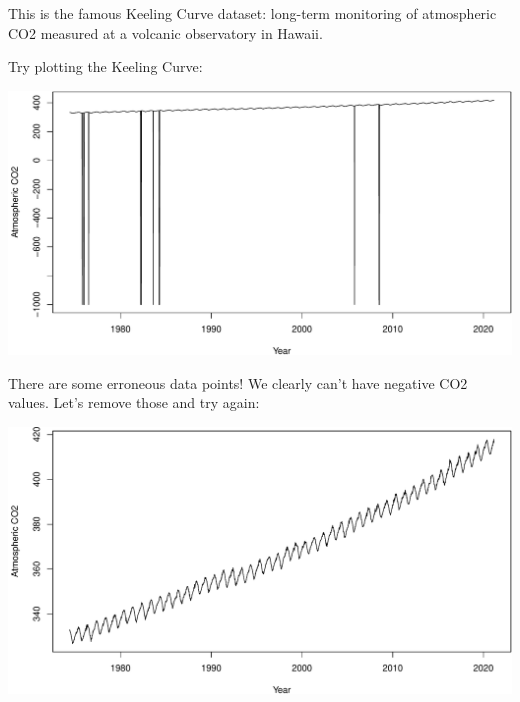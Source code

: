 \documentclass[
]{book}
\newenvironment{Shaded}{\begin{snugshade}}{\end{snugshade}}
\newcommand{\AttributeTok}[1]{\textcolor[rgb]{0.77,0.63,0.00}{#1}}
\newcommand{\DecValTok}[1]{\textcolor[rgb]{0.00,0.00,0.81}{#1}}
\newcommand{\FunctionTok}[1]{\textcolor[rgb]{0.00,0.00,0.00}{#1}}
\newcommand{\NormalTok}[1]{#1}
\newcommand{\OtherTok}[1]{\textcolor[rgb]{0.56,0.35,0.01}{#1}}
\newcommand{\SpecialCharTok}[1]{\textcolor[rgb]{0.00,0.00,0.00}{#1}}
\newcommand{\StringTok}[1]{\textcolor[rgb]{0.31,0.60,0.02}{#1}}
\begin{document}
This is the famous Keeling Curve dataset: long-term monitoring of atmospheric CO2 measured at a volcanic observatory in Hawaii.

Try plotting the Keeling Curve:

\begin{Shaded}
\end{Shaded}

\includegraphics{figures/unnamed-chunk-313-1.pdf}

There are some erroneous data points! We clearly can't have negative CO2 values. Let's remove those and try again:

\begin{Shaded}
\end{Shaded}

\includegraphics{figures/unnamed-chunk-314-1.pdf}
\end{document}
